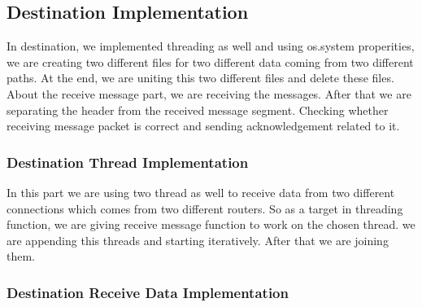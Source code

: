 \documentclass[conference]{IEEEtran}
\begin{document}
\subsection{Destination Implementation}

In destination, we implemented threading as well and using os.system properities, we are creating two different files for two different data coming from two different paths. At the end, we are uniting this two different files and delete these files. About the receive message part, we are receiving the messages. After that we are separating the header from the received message segment. Checking whether receiving message packet is correct and sending acknowledgement related to it.
\subsubsection{Destination Thread Implementation}

In this part we are using two thread as well to receive data from two different connections which comes from two different routers. So as a target in threading function, we are giving receive message function to work on the chosen thread. we are appending this threads and starting iteratively. After that we are joining them.
\subsubsection{Destination Receive Data Implementation}
\end{document}
